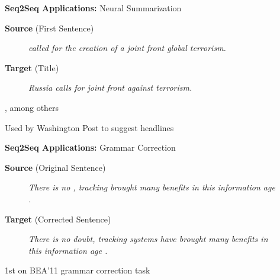 \documentclass{beamer}
\let\tempone\itemize
\let\temptwo\enditemize
\renewenvironment{itemize}{\tempone\addtolength{\itemsep}{0.5\baselineskip}}{\temptwo}
\newcommand{\air}{\vspace{0.25cm}}
\newcommand{\mair}{\vspace{-0.25cm}}
\newcommand{\Cite}[1]{{\footnotesize \citep{#1}}}
\begin{document}
\begin{frame}
  \centerline{\textbf{Seq2Seq Applications:} \alert{Neural Summarization} \Cite{Rush2015} }
  \begin{center}
    \textbf{Source} (First Sentence)
  \end{center}
  
  \begin{figure}
    \textit{
      called  for the creation of
      a joint front  global terrorism. }
  \end{figure}

  \begin{center}
    \textbf{Target} (Title)
  \end{center}
  \mair

  \begin{figure}
    \centering
    \textit{\alert<2>{Russia} calls for joint
      front \alert<2>{against} terrorism.}
  \end{figure}

\air
\air

  \begin{itemize}
  \item \Cite{mou2015backward} \Cite{cheng2016neural} \Cite{toutanovadataset} \Cite{wang2016experimental} \Cite{takaseneural}, among others
  \item Used by Washington Post to suggest headlines \Cite{shuguangwang}
  \end{itemize}
\end{frame}

\begin{frame}
  \centerline{\textbf{Seq2Seq Applications:} \alert{Grammar Correction} \Cite{Schmaltz2016} }
  
  \begin{center}
    \textbf{Source} (Original Sentence)
  \end{center}
  
  \begin{figure}
    \textit{There is no , tracking  brought many benefits in this information
age . }
  \end{figure}

  \begin{center}
    \textbf{Target} (Corrected Sentence)
  \end{center}
  \mair

  \begin{figure}
    \centering
    \textit{There is no doubt, tracking systems have
      brought many benefits in this information
      age . }
  \end{figure}

  \begin{itemize}
  \item 1st on BEA'11 grammar correction task \Cite{Daudaravicius2016}
  \end{itemize}
\end{frame}
\end{document}
